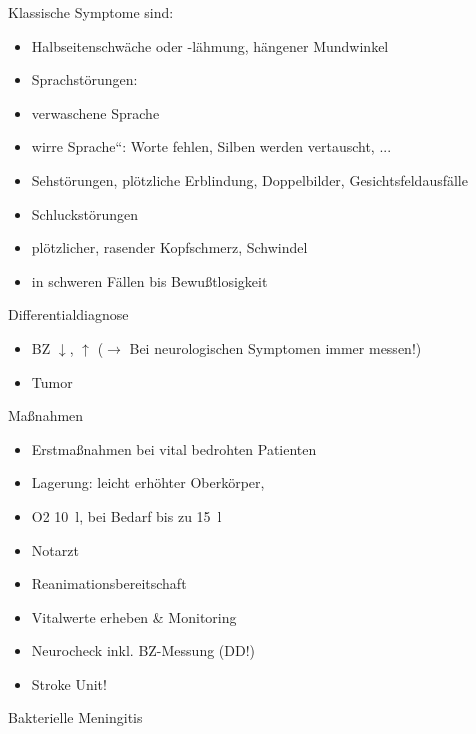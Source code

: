 \documentclass{article}
\begin{document}
Klassische Symptome sind:

\begin{itemize}
\item Halbseitenschw\"ache oder -l\"ahmung, h\"angener Mundwinkel

\item Sprachst\"orungen:

\end{itemize}
\begin{itemize}
\item verwaschene Sprache 

\item {\quotedblbase}wirre Sprache{\textquotedblleft}: Worte fehlen,
Silben werden vertauscht, ...

\end{itemize}
\begin{itemize}
\item Sehst\"orungen, pl\"otzliche Erblindung, Doppelbilder,
Gesichtsfeldausf\"alle

\item Schluckst\"orungen

\item pl\"otzlicher, rasender Kopfschmerz, Schwindel

\item in schweren F\"allen bis Bewu{\ss}tlosigkeit

\end{itemize}
Differentialdiagnose

\begin{itemize}
\item BZ ${\downarrow}$, ${\uparrow}$ (${\rightarrow}$ Bei
neurologischen Symptomen immer messen!)

\item Tumor

\end{itemize}
Ma{\ss}nahmen

\begin{itemize}
\item Erstma{\ss}nahmen bei vital bedrohten Patienten

\end{itemize}
\begin{itemize}
\item Lagerung: leicht erh\"ohter Oberk\"orper,

\item O2 10~l, bei Bedarf bis zu 15~l

\item Notarzt

\item Reanimationsbereitschaft

\end{itemize}
\begin{itemize}
\item Vitalwerte erheben \& Monitoring

\item Neurocheck inkl. BZ-Messung (DD!)

\item Stroke Unit!

\end{itemize}
Bakterielle Meningitis
\end{document}
